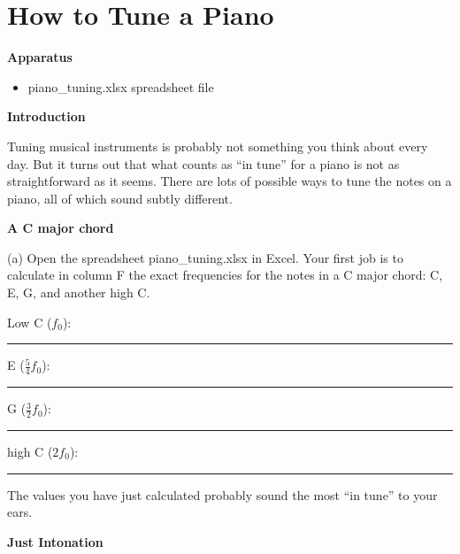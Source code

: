 \section{How to Tune a Piano}
\begin{comment}
This lab was written by Matt Trawick for spring of 2017, based on an exercise I did in class for the last couple of years.  This is a little off the beaten path, but some students think it's fun!  It takes only 10 or 15 minutes.

\end{comment}

\makelabheader %

\bigskip
\textbf{Apparatus}
\begin{itemize}[nosep]
\item piano\_tuning.xlsx spreadsheet file
\end{itemize}

\medskip
\textbf{Introduction}

Tuning musical instruments is probably not something you think about every day.  But it turns out that what counts as ``in tune'' for a piano is not as straightforward as it seems.  There are lots of possible ways to tune the notes on a piano, all of which sound subtly different.

\medskip
\textbf{A C major chord}

(a) Open the spreadsheet piano\_tuning.xlsx in Excel.  Your first job is to calculate in column F the exact frequencies for the notes in a C major chord: C, E, G, and another high C. 

\vspace{-0.25in}

\hspace{1.10in}\raisebox{-0.25in}{130.8~Hz}

\vspace{-0.15in}
\hfill{}
Low C ($f_0$): \rule{.7in}{0.1pt}\hfill{}
E ($\frac{5}{4}f_0$): \rule{.7in}{0.1pt}\hfill{}
G ($\frac{3}{2}f_0$): \rule{.7in}{0.1pt}\hfill{}
high C ($2f_0$): \rule{.7in}{0.1pt}\hfill{}

The values you have just calculated probably sound the most ``in tune'' to your ears.

\medskip
\textbf{Just Intonation}

